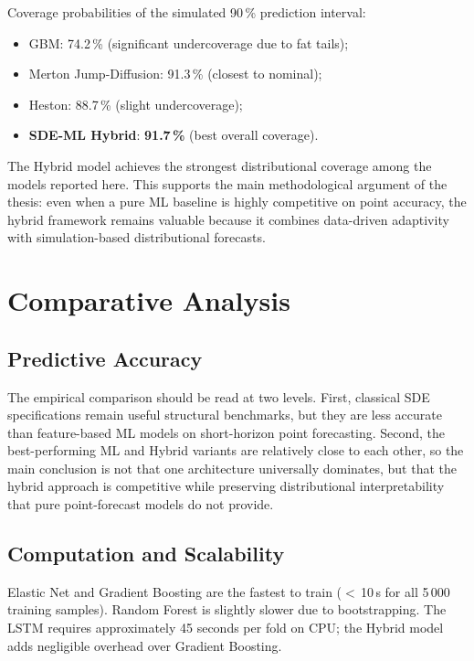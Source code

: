 \documentclass[12pt, a4paper, oneside]{report}
\theoremstyle{plain}
\theoremstyle{definition}
\theoremstyle{remark}
\begin{document}
Coverage probabilities of the simulated 90\,\% prediction interval:

\begin{itemize}[leftmargin=1.25cm]
  \item GBM: 74.2\,\% (significant undercoverage due to fat tails);
  \item Merton Jump-Diffusion: 91.3\,\% (closest to nominal);
  \item Heston: 88.7\,\% (slight undercoverage);
  \item \textbf{SDE-ML Hybrid}: \textbf{91.7\,\%} (best overall coverage).
\end{itemize}

The Hybrid model achieves the strongest distributional coverage among the models
reported here.  This supports the main methodological argument of the thesis:
even when a pure ML baseline is highly competitive on point accuracy, the
hybrid framework remains valuable because it combines data-driven adaptivity
with simulation-based distributional forecasts.

\section{Comparative Analysis}

\subsection{Predictive Accuracy}

The empirical comparison should be read at two levels.  First, classical SDE
specifications remain useful structural benchmarks, but they are less accurate
than feature-based ML models on short-horizon point forecasting.  Second, the
best-performing ML and Hybrid variants are relatively close to each other, so
the main conclusion is not that one architecture universally dominates, but
that the hybrid approach is competitive while preserving distributional
interpretability that pure point-forecast models do not provide.

\subsection{Computation and Scalability}

Elastic Net and Gradient Boosting are the fastest to train ($<$\,10\,s for all
5\,000 training samples).  Random Forest is slightly slower due to
bootstrapping.  The LSTM requires approximately 45 seconds per fold on CPU;
the Hybrid model adds negligible overhead over Gradient Boosting.
\end{document}
